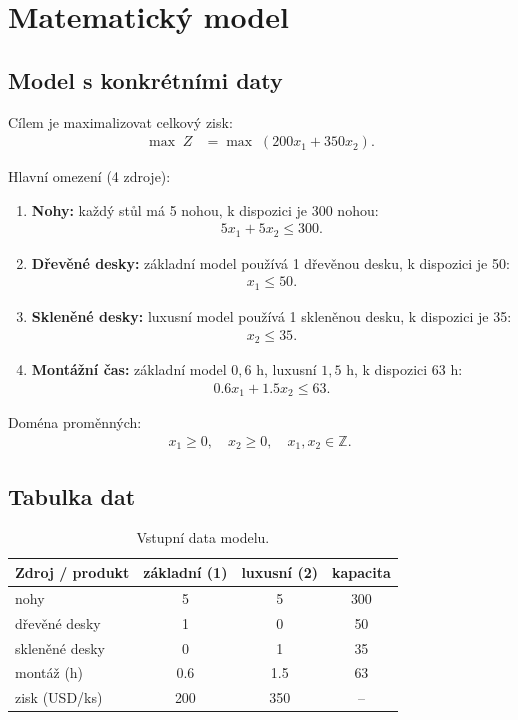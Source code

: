 \documentclass[../sablona-main.tex]{subfiles}
\begin{document}
	
	
	\section{Matematický model}
	
	\subsection{Model s konkrétními daty}
	Cílem je maximalizovat celkový zisk:
	\begin{align}
		\max\; Z &=\max\; (200x_1 + 350x_2).
	\end{align}
	
	Hlavní omezení (4 zdroje):
	
	\begin{enumerate}
		\item \textbf{Nohy:} každý stůl má 5 nohou, k dispozici je 300 nohou:
		\begin{align}
			5x_1 + 5x_2 \le 300.
		\end{align}
		
		\item \textbf{Dřevěné desky:} základní model používá 1 dřevěnou desku, k dispozici je 50:
		\begin{align}
			x_1 \le 50.
		\end{align}
		
		\item \textbf{Skleněné desky:} luxusní model používá 1 skleněnou desku, k dispozici je 35:
		\begin{align}
			x_2 \le 35.
		\end{align}
		
		\item \textbf{Montážní čas:} základní model $0{,}6$ h, luxusní $1{,}5$ h, k dispozici 63 h:
		\begin{align}
			0.6x_1 + 1.5x_2 \le 63.
		\end{align}
	\end{enumerate}
	
	Doména proměnných:
	\begin{align}
		x_1 \ge 0,\quad x_2 \ge 0, \quad x_1,x_2\in \mathbb{Z}.
	\end{align}
	
	\subsection{Tabulka dat}
	\begin{table}[h!]
		\centering
		\begin{tabular}{lccc}
			\toprule
			Zdroj / produkt & základní (1) & luxusní (2) & kapacita \\
			\midrule
			nohy & 5 & 5 & 300 \\
			dřevěné desky & 1 & 0 & 50 \\
			skleněné desky & 0 & 1 & 35 \\
			montáž (h) & 0.6 & 1.5 & 63 \\
			\midrule
			zisk (USD/ks) & 200 & 350 & -- \\
			\bottomrule
		\end{tabular}
		\caption{Vstupní data modelu.}
	\end{table}
	
\end{document}
